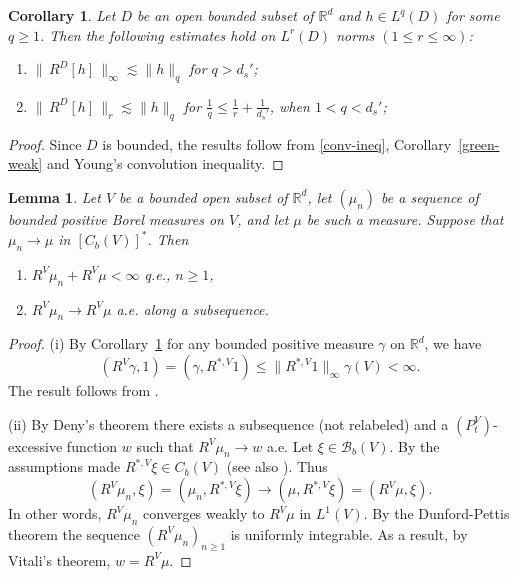 \documentclass[11pt,a4paper,reqno]{amsart}
\newtheorem{lemma}[theorem]{\bf Lemma}
\newtheorem{corollary}[theorem]{\bf Corollary}
\theoremstyle{definition}
\numberwithin{equation}{section}
\begin{document}
\begin{corollary}\label{green-young}
Let $D$ be an open bounded subset of $\mathbb R^d$ and $h\in L^q(D)$ for some $q\geq 1$. Then the following estimates hold on $L^r(D)$ norms $(1\leq r\leq\infty)$:
\begin{enumerate}
\item $\|\,R^D[h]\,\|_\infty\lesssim \|h\|_q$ for $q>d_s'$;
\item $\|\,R^D[h]\,\|_r\lesssim \|h\|_q$ for $\frac{1}{q}\leq\frac{1}{r}+\frac{1}{d_s'}$, when $1<q<d_s'$;
\end{enumerate}
\end{corollary}
\begin{proof}
Since $D$ is bounded, the results follow from  \eqref{conv-ineq},  Corollary~\ref{green-weak}
and Young’s convolution inequality.
\end{proof}


\begin{lemma}
\label{lm2.2}
Let $V$ be a  bounded open subset of $\mathbb R^d$, let   $(\mu_n)$ be a sequence of   bounded 
positive Borel measures on $V$, and let $\mu$ be such a measure. Suppose that $\mu_n\to \mu $ in $[C_b(V)]^*$. Then
\begin{enumerate}
\item[(i)] $R^V\mu_n+R^V\mu<\infty$ q.e., $n\ge 1$,
\item[(ii)] $R^V\mu_n\to R^V\mu$ a.e. along a subsequence.
\end{enumerate}
\end{lemma}
\begin{proof}
(i) By Corollary~\ref{green-young} for any bounded positive measure $\gamma$ on $\mathbb R^d$, we have 
\[
(R^V\gamma,1)=(\gamma,R^{*,V}1)\le \|R^{*,V}1\|_\infty\gamma(V)<\infty.
\]
The result follows from \cite[Proposition VI.2.3]{BG}.

(ii) By Deny's theorem  there exists a subsequence (not relabeled) 
and a $(P^V_t)$-excessive function $w$  such that $R^V\mu_n\to w$ a.e. 
Let $\xi\in \mathscr B_b(V)$. By the assumptions made  $R^{*,V}\xi\in C_b(V)$ (see also \cite[Theorem 3.4]{SW1}).
Thus 
\[
(R^{V}\mu_n,\xi)=(\mu_n,R^{*,V}\xi)\to (\mu,R^{*,V}\xi)=(R^{V}\mu,\xi).
\]
In other words, $R^{V}\mu_n$ converges weakly to $R^V\mu$ in $L^1(V)$.
By the Dunford-Pettis theorem the sequence $(R^{V}\mu_n)_{n\ge 1}$ is uniformly integrable.
As a result, by Vitali's theorem,  $w=R^V\mu$.
\end{proof}
\end{document}
